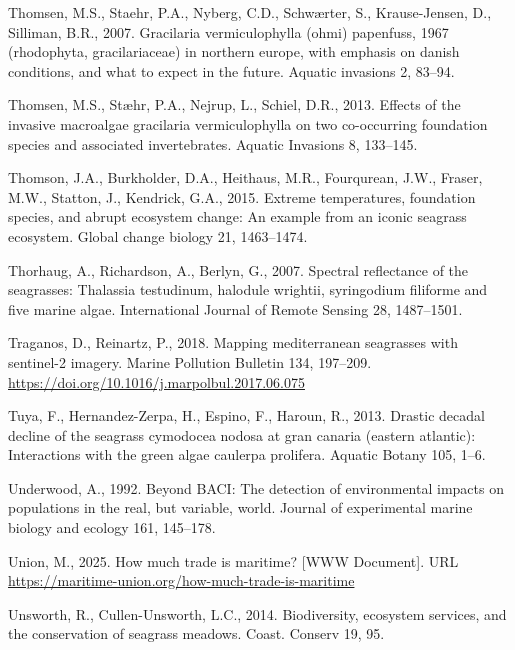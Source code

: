 \documentclass[
  letterpaper,
  11pt,
  english,
  singlespacing,
  headsepline]{MastersDoctoralThesis}
\newlength{\cslhangindent}
\newenvironment{CSLReferences}[2] %
 {\begin{list}{}{%
  \setlength{\itemindent}{0pt}
  \setlength{\leftmargin}{0pt}
  \setlength{\parsep}{0pt}
  \ifodd #1
   \setlength{\leftmargin}{\cslhangindent}
   \setlength{\itemindent}{-1\cslhangindent}
  \fi
  \setlength{\itemsep}{#2\baselineskip}}}
 {\end{list}}
\begin{document}
\begin{CSLReferences}{1}{0}
Thomsen, M.S., Staehr, P.A., Nyberg, C.D., Schwærter, S., Krause-Jensen,
D., Silliman, B.R., 2007. Gracilaria vermiculophylla (ohmi) papenfuss,
1967 (rhodophyta, gracilariaceae) in northern europe, with emphasis on
danish conditions, and what to expect in the future. Aquatic invasions
2, 83--94.

Thomsen, M.S., Stæhr, P.A., Nejrup, L., Schiel, D.R., 2013. Effects of
the invasive macroalgae gracilaria vermiculophylla on two co-occurring
foundation species and associated invertebrates. Aquatic Invasions 8,
133--145.

Thomson, J.A., Burkholder, D.A., Heithaus, M.R., Fourqurean, J.W.,
Fraser, M.W., Statton, J., Kendrick, G.A., 2015. Extreme temperatures,
foundation species, and abrupt ecosystem change: An example from an
iconic seagrass ecosystem. Global change biology 21, 1463--1474.

Thorhaug, A., Richardson, A., Berlyn, G., 2007. Spectral reflectance of
the seagrasses: Thalassia testudinum, halodule wrightii, syringodium
filiforme and five marine algae. International Journal of Remote Sensing
28, 1487--1501.

Traganos, D., Reinartz, P., 2018. Mapping mediterranean seagrasses with
sentinel-2 imagery. Marine Pollution Bulletin 134, 197--209.
\url{https://doi.org/10.1016/j.marpolbul.2017.06.075}

Tuya, F., Hernandez-Zerpa, H., Espino, F., Haroun, R., 2013. Drastic
decadal decline of the seagrass cymodocea nodosa at gran canaria
(eastern atlantic): Interactions with the green algae caulerpa
prolifera. Aquatic Botany 105, 1--6.

Underwood, A., 1992. Beyond BACI: The detection of environmental impacts
on populations in the real, but variable, world. Journal of experimental
marine biology and ecology 161, 145--178.

Union, M., 2025. How much trade is maritime? {[}WWW Document{]}. URL
\url{https://maritime-union.org/how-much-trade-is-maritime}

Unsworth, R., Cullen-Unsworth, L.C., 2014. Biodiversity, ecosystem
services, and the conservation of seagrass meadows. Coast. Conserv 19,
95.


\end{CSLReferences}
\end{document}
